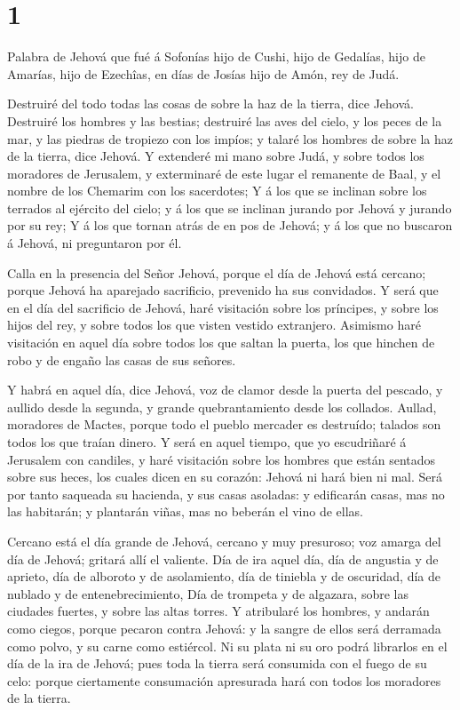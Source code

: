 \hypertarget{section}{%
\section{1}\label{section}}

 Palabra de Jehová que fué á Sofonías hijo de Cushi, hijo de
Gedalías, hijo de Amarías, hijo de Ezechîas, en días de Josías hijo de
Amón, rey de Judá.

 Destruiré del todo todas las cosas de sobre la haz de la
tierra, dice Jehová.  Destruiré los hombres y las bestias;
destruiré las aves del cielo, y los peces de la mar, y las piedras de
tropiezo con los impíos; y talaré los hombres de sobre la haz de la
tierra, dice Jehová.  Y extenderé mi mano sobre Judá, y
sobre todos los moradores de Jerusalem, y exterminaré de este lugar el
remanente de Baal, y el nombre de los Chemarim con los sacerdotes;
 Y á los que se inclinan sobre los terrados al ejército del
cielo; y á los que se inclinan jurando por Jehová y jurando por su rey;
 Y á los que tornan atrás de en pos de Jehová; y á los que
no buscaron á Jehová, ni preguntaron por él.

 Calla en la presencia del Señor Jehová, porque el día de
Jehová está cercano; porque Jehová ha aparejado sacrificio, prevenido ha
sus convidados.  Y será que en el día del sacrificio de
Jehová, haré visitación sobre los príncipes, y sobre los hijos del rey,
y sobre todos los que visten vestido extranjero.  Asimismo
haré visitación en aquel día sobre todos los que saltan la puerta, los
que hinchen de robo y de engaño las casas de sus señores.

 Y habrá en aquel día, dice Jehová, voz de clamor desde la
puerta del pescado, y aullido desde la segunda, y grande quebrantamiento
desde los collados.  Aullad, moradores de Mactes, porque
todo el pueblo mercader es destruído; talados son todos los que traían
dinero.  Y será en aquel tiempo, que yo escudriñaré á
Jerusalem con candiles, y haré visitación sobre los hombres que están
sentados sobre sus heces, los cuales dicen en su corazón: Jehová ni hará
bien ni mal.  Será por tanto saqueada su hacienda, y sus
casas asoladas: y edificarán casas, mas no las habitarán; y plantarán
viñas, mas no beberán el vino de ellas.

 Cercano está el día grande de Jehová, cercano y muy
presuroso; voz amarga del día de Jehová; gritará allí el valiente.
 Día de ira aquel día, día de angustia y de aprieto, día de
alboroto y de asolamiento, día de tiniebla y de oscuridad, día de
nublado y de entenebrecimiento,  Día de trompeta y de
algazara, sobre las ciudades fuertes, y sobre las altas torres.
 Y atribularé los hombres, y andarán como ciegos, porque
pecaron contra Jehová: y la sangre de ellos será derramada como polvo, y
su carne como estiércol.  Ni su plata ni su oro podrá
librarlos en el día de la ira de Jehová; pues toda la tierra será
consumida con el fuego de su celo: porque ciertamente consumación
apresurada hará con todos los moradores de la tierra.

